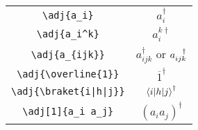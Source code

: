\documentclass{jsarticle}
\begin{document}
%
\begin{table}[htpt]
\centering
\begin{tabular}{cc}
	\verb|\adj{a_i}| & $a_i^{\dagger}$ \\
	\verb|\adj{a_i^k}| & $a_i^{k\dagger}$ \\
	\verb|\adj{a_{ijk}}| & $a_{ijk}^{\dagger}$ or $a_{ijk}^{\newlength{\width}\settowidth{\width}{$\scriptstyle ijk$}\hbox to\width{\hfill$\scriptstyle\dagger$}}$ \\
	\verb|\adj{\overline{1}}| & ${\overline{1}}^{\dagger}$ \\
	\verb/\adj{\braket{i|h|j}}/ & $\braket{i|h|j}^{\dagger}$ \\
	\verb|\adj[1]{a_i a_j}| & $\left(a_i a_j\right)^{\dagger}$
\end{tabular}
\end{table}
\end{document}

